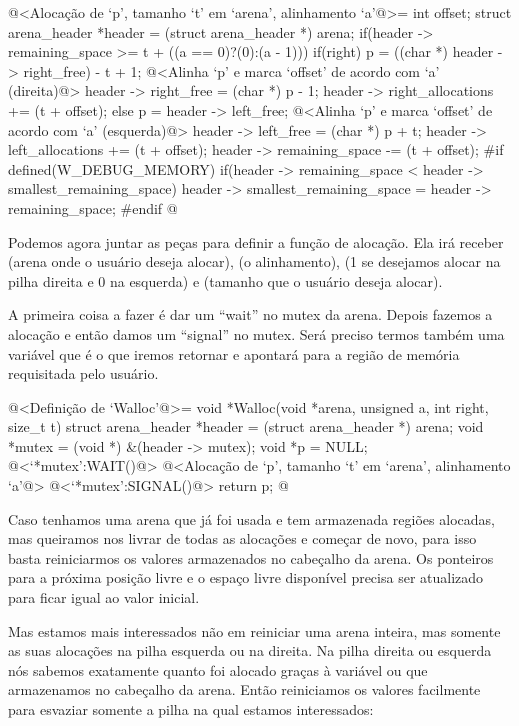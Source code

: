 \iniciocodigo
@<Alocação de `p', tamanho `t' em `arena', alinhamento `a'@>=
{
  int offset;
  struct arena_header *header = (struct arena_header *) arena;
  if(header -> remaining_space >= t + ((a == 0)?(0):(a - 1))){
    if(right){
      p = ((char *) header -> right_free) - t + 1;
      @<Alinha `p' e marca `offset' de acordo com `a' (direita)@>
      header -> right_free = (char *) p - 1;
      header -> right_allocations += (t + offset);
    }
    else{
      p = header -> left_free;
      @<Alinha `p' e marca `offset' de acordo com `a' (esquerda)@>
      header -> left_free = (char *) p + t;
      header -> left_allocations += (t + offset);
    }
    header -> remaining_space -= (t + offset);
#if defined(W_DEBUG_MEMORY)
    if(header -> remaining_space < header -> smallest_remaining_space)
      header -> smallest_remaining_space = header -> remaining_space;
#endif
  }
}
@
\fimcodigo


Podemos agora juntar as peças para definir a função de alocação. Ela
irá receber  (arena onde o usuário deseja alocar),
 (o alinhamento),  (1 se desejamos
alocar na pilha direita e 0 na esquerda) e  (tamanho que
o usuário deseja alocar).

A primeira coisa a fazer é dar um ``wait'' no mutex da arena. Depois
fazemos a alocação e então damos um ``signal'' no mutex. Será preciso
termos também uma variável  que é o que iremos retornar
e apontará para a região de memória requisitada pelo usuário.


\iniciocodigo
@<Definição de `Walloc'@>=
void *Walloc(void *arena, unsigned a, int right, size_t t){
  struct arena_header *header = (struct arena_header *) arena;
  void *mutex = (void *) &(header -> mutex);
  void *p = NULL;
  @<`*mutex':WAIT()@>
  @<Alocação de `p', tamanho `t' em `arena', alinhamento `a'@>
  @<`*mutex':SIGNAL()@>
  return p;
}
@
\fimcodigo


Caso tenhamos uma arena que já foi usada e tem armazenada regiões
alocadas, mas queiramos nos livrar de todas as alocações e começar de
novo, para isso basta reiniciarmos os valores armazenados no cabeçalho
da arena. Os ponteiros para a próxima posição livre e o espaço livre
disponível precisa ser atualizado para ficar igual ao valor inicial.

Mas estamos mais interessados não em reiniciar uma arena inteira, mas
somente as suas alocações na pilha esquerda ou na direita. Na pilha
direita ou esquerda nós sabemos exatamente quanto foi alocado graças à
variável 
ou  que armazenamos no cabeçalho da
arena. Então reiniciamos os valores facilmente para esvaziar somente a
pilha na qual estamos interessados:

